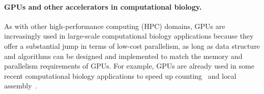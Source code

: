 \label{sec:we-need-performance-and-scalability}

\paragraph{GPUs and other accelerators in computational biology.}
As with other high-performance computing (HPC) domains,
GPUs are increasingly used in large-scale computational biology applications because they offer a substantial jump in terms of low-cost parallelism, as long as data structure and algorithms can be designed and implemented to match the memory and parallelism requirements of GPUs.
%
For example, GPUs are already used in some recent computational biology applications to speed up \kmer counting~\cite{nisa2021distributed} and local assembly~\cite{awan2021accelerating}.

